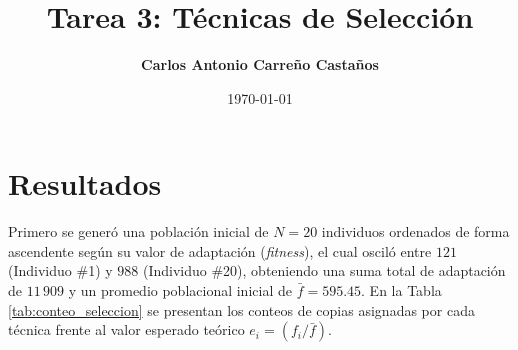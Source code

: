 \documentclass[11pt,letterpaper]{article}
\title{\textbf{Tarea 3: Técnicas de Selección}}
\author{\textbf{Carlos Antonio Carreño Castaños}}
\date{\today}
\begin{document}
\maketitle


\section{Resultados}

Primero se generó una población inicial de $N = 20$ individuos ordenados de forma ascendente según su valor de adaptación (\textit{fitness}), el cual osciló entre $121$ (Individuo \#1) y $988$ (Individuo \#20), obteniendo una suma total de adaptación de $11\,909$ y un promedio poblacional inicial de $\bar{f} = 595.45$. En la Tabla \ref{tab:conteo_seleccion} se presentan los conteos de copias asignadas por cada técnica frente al valor esperado teórico $e_i = (f_i / \bar{f})$.
\end{document}
